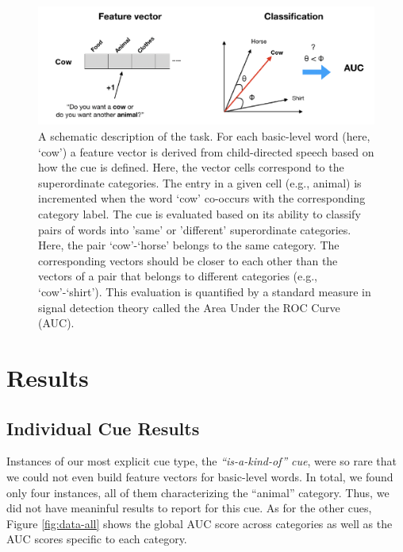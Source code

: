\documentclass[english,,man,floatsintext]{apa6}
\begin{document}
\begin{figure}[h]

{\centering \includegraphics{cogsci_journal_files/figure-latex/task-1} 

}

\caption{\label{fig:task} A schematic description of the task. For each basic-level word (here, `cow') a feature vector is derived from child-directed speech based on how the cue is defined. Here, the vector cells correspond to the superordinate categories. The entry in a given cell (e.g., animal) is incremented when the word `cow' co-occurs with the corresponding category label. The cue is evaluated based on its ability to classify pairs of words into 'same' or 'different' superordinate categories. Here, the pair `cow'-`horse' belongs to the same category. The corresponding vectors should be closer to each other than the vectors of a pair that belongs to different categories (e.g., `cow'-`shirt'). This evaluation is quantified by a standard measure in signal detection theory called the Area Under the ROC Curve (AUC).}\label{fig:task}
\end{figure}

\hypertarget{results}{%
\section{Results}\label{results}}

\hypertarget{individual-cue-results}{%
\subsection{Individual Cue Results}\label{individual-cue-results}}

Instances of our most explicit cue type, the \emph{\enquote{is-a-kind-of} cue}, were so rare that we could not even build feature vectors for basic-level words. In total, we found only four instances, all of them characterizing the \enquote{animal} category. Thus, we did not have meaninful results to report for this cue. As for the other cues, Figure \ref{fig:data-all} shows the global AUC score across categories as well as the AUC scores specific to each category.
\end{document}
